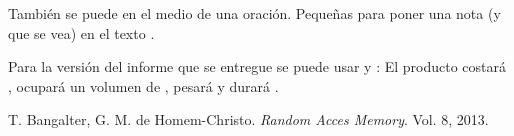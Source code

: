 




\lipsum[1-2]
																			

También se puede  en el medio de una oración. Pequeñas  para poner una nota (y que se vea) en el texto \cite{ref:cita1}.

Para la versión del informe que se entregue se puede usar \tbd y \tbc: El producto costará \TBD, ocupará un volumen de \tbd, pesará \TBC y durará \tbc.




\newpage
\begin{flushleft}
\begin{thebibliography}{9}
T. Bangalter, G. M. de Homem-Christo. \textit{Random Acces Memory}. Vol. 8, 2013.

\end{thebibliography}
\end{flushleft}



